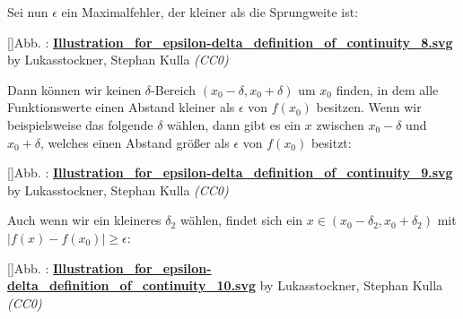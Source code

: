 \documentclass[fontsize=9pt,
               parskip=half-,
               DIV=14,
               listof=chapterentry,
               tocflat]{scrbook}
\newcounter{imagelabel}
\begin{document}
Sei nun $\epsilon $ ein Maximalfehler, der kleiner als die Sprungweite ist:

[]{Abb. : \protect\href{https://commons.wikimedia.org/wiki/File:Illustration_for_epsilon-delta_definition_of_continuity_8.svg}{\textbf{Illustration\allowbreak\_for\allowbreak\_epsilon\allowbreak-delta\allowbreak\_definition\allowbreak\_of\allowbreak\_continuity\allowbreak\_8.svg}} by Lukasstockner, Stephan Kulla \textit{(CC0)}}\begin{center}
\end{center}

Dann können wir keinen $\delta $-Bereich $(x_{0}-\delta ,x_{0}+\delta )$ um $x_{0}$ finden, in dem alle Funktionswerte einen Abstand kleiner als $\epsilon $ von $f(x_{0})$ besitzen. Wenn wir beispielsweise das folgende $\delta $ wählen, dann gibt es ein $x$ zwischen $x_{0}-\delta $ und $x_{0}+\delta $, welches einen Abstand größer als $\epsilon $ von $f(x_{0})$ besitzt:

[]{Abb. : \protect\href{https://commons.wikimedia.org/wiki/File:Illustration_for_epsilon-delta_definition_of_continuity_9.svg}{\textbf{Illustration\allowbreak\_for\allowbreak\_epsilon\allowbreak-delta\allowbreak\_definition\allowbreak\_of\allowbreak\_continuity\allowbreak\_9.svg}} by Lukasstockner, Stephan Kulla \textit{(CC0)}}\begin{center}
\end{center}

Auch wenn wir ein kleineres $\delta _{2}$ wählen, findet sich ein $x\in (x_{0}-\delta _{2},x_{0}+\delta _{2})$ mit $|f(x)-f(x_{0})|\geq \epsilon $:

[]{Abb. : \protect\href{https://commons.wikimedia.org/wiki/File:Illustration_for_epsilon-delta_definition_of_continuity_10.svg}{\textbf{Illustration\allowbreak\_for\allowbreak\_epsilon\allowbreak-delta\allowbreak\_definition\allowbreak\_of\allowbreak\_continuity\allowbreak\_10.svg}} by Lukasstockner, Stephan Kulla \textit{(CC0)}}\begin{center}
\end{center}
\end{document}
